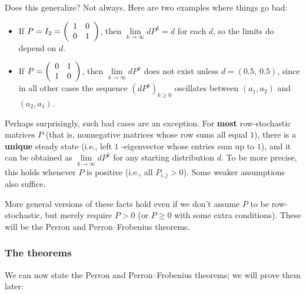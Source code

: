 \documentclass[numbers=enddot,12pt,final,onecolumn,notitlepage]{scrartcl}%
\numberwithin{exer}{subsection}
\theoremstyle{definition}
\begin{document}
Does this generalize? Not always. Here are two examples where things go bad:

\begin{itemize}
\item If $P=I_{2}=\left(
\begin{array}
[c]{cc}%
1 & 0\\
0 & 1
\end{array}
\right)  $, then $\lim\limits_{k\rightarrow\infty}dP^{k}=d$ for each $d$, so
the limits do depend on $d$.

\item If $P=\left(
\begin{array}
[c]{cc}%
0 & 1\\
1 & 0
\end{array}
\right)  $, then $\lim\limits_{k\rightarrow\infty}dP^{k}$ does not exist
unless $d=\left(  0.5,\ 0.5\right)  $, since in all other cases the sequence
$\left(  dP^{k}\right)  _{k\geq0}$ oscillates between $\left(  a_{1}%
,a_{2}\right)  $ and $\left(  a_{2},a_{1}\right)  $.
\end{itemize}

Perhaps surprisingly, such bad cases are an exception. For \textbf{most}
row-stochastic matrices $P$ (that is, nonnegative matrices whose row sums all
equal $1$), there is a \textbf{unique} steady state (i.e., left $1$%
-eigenvector whose entries sum up to $1$), and it can be obtained as
$\lim\limits_{k\rightarrow\infty}dP^{k}$ for any starting distribution $d$. To
be more precise, this holds whenever $P$ is positive (i.e., all $P_{i,j}>0$).
Some weaker assumptions also suffice.

More general versions of these facts hold even if we don't assume $P$ to be
row-stochastic, but merely require $P>0$ (or $P\geq0$ with some extra
conditions). These will be the Perron and Perron--Frobenius theorems.

\subsubsection{The theorems}

We can now state the Perron and Perron--Frobenius theorems; we will prove them later:
\end{document}
